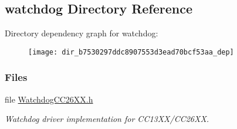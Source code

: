 \subsection{watchdog Directory Reference}
\label{dir_b7530297ddc8907553d3ead70bcf53aa}
Directory dependency graph for watchdog\+:
\nopagebreak
\begin{figure}[H]
\begin{center}
\leavevmode
\texttt{[image: dir\_b7530297ddc8907553d3ead70bcf53aa\_dep]}
\end{center}
\end{figure}
\subsubsection*{Files}
\begin{DoxyCompactItemize}
\item 
file \hyperlink{_watchdog_c_c26_x_x_8h}{Watchdog\+C\+C26\+X\+X.\+h}
\begin{DoxyCompactList}\small\item\em Watchdog driver implementation for C\+C13\+X\+X/\+C\+C26\+X\+X. \end{DoxyCompactList}\end{DoxyCompactItemize}
